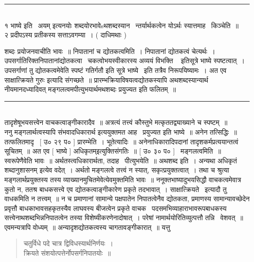 \documentclass[11pt, openany]{book}
\begin{document}
\begin{multicols}{2}
\noindent
\rule{1\linewidth}{0.5pt}\\

१ भाष्ये इति \textendash\ अयम् इत्यनयोः शब्दयोरभावेsथशब्दस्यान \textendash\ न्तर्यार्थकत्वेन योऽर्थः स्यात्तमाह \textendash\ किञ्चेति~॥\\

२ प्रदीपऽस्य प्रतीकस्य सत्ताऽवगम्या~। ( दाधिमथाः ) 

\columnbreak

\noindent
शब्दः प्रयोजनवाचीति भावः~॥ निपातानां च द्योतकत्वमिति~। निपातानां द्योतकत्वं चेत्यर्थः~। उपसर्गातिरिक्तनिपातानांद्योतकत्वा \textendash\ चकत्वोभयस्वीकारस्य {\qt अव्ययं विभक्ति \textendash\ } इतिसूत्रे भाष्ये स्पष्टत्वात्~। उपसर्गाणां तु द्योतकत्वमेवेति स्पष्टं गतिर्गतौ इति सूत्रे भाष्ये \textendash\ इति तत्रैव निरूपयिष्यामः~। अत एव साक्षात्क्रियते गुरुः इत्यादि संगच्छते~॥ प्रारम्भक्रियाविषयत्वद्योतकस्यापि अथशब्दस्यान्यार्थ नीयमानदध्यादिवत् मङ्गलत्वमपीत्युभयार्थमथशब्दः प्रयुज्यत इति फलितम्~॥

\noindent
\rule{1\linewidth}{0.5pt}\\

तादृशेषूभयसत्त्वेन वाचकत्वाङ्गीकारादैव~॥ अत्रत्यं तत्त्वं कौस्तुभे मत्कृततद्व्याख्याने च स्पष्टम्~॥\\

ननु मङ्गलार्थत्वस्यापि संभवादधिकारार्थ इत्ययुक्तमत आह \textendash\ प्रयुज्यत इति भाष्ये~॥ अनेन तत्सिद्धिः~॥ तत्फलितमादृ \textendash\ [ उ० २९ प० ] प्रारम्भेति~। भूतेत्यादिः~॥ अनेनाधिकारादिपदानां तादृशकर्मप्रत्ययान्तत्वं सूचितम्~॥ अत एव [ भाष्ये ] {\qt अधिकृतम्}इत्युक्तिसंगतिः~॥ [ उ० ३० प० ] \textendash\ मङ्गलत्वमिति~॥ स्वरूपेणैवेति भावः~॥ अर्थतस्त्वधिकारार्थता, तदाह \textendash\ पीत्युभयेति~॥ अथशब्द इति~। अन्यथा {\qt अधिकृतं शब्दानुशासनम्} इत्येव वदेत्~। अर्थतो मङ्गलत्वे तत्त्वं न स्यात्, सकृत्प्रयुक्तत्वात्~। तथा च श्रुत्या मङ्गलार्थप्रयुक्तस्य तस्य व्याख्यानमुचितमेवेत्येवमुक्तमिति भावः~॥ ननूक्तभाष्यादुभयसिद्धौ वाचकत्वमेवात्र कुतो न, ततश्र बाधकसत्त्वे एव द्योतकत्वाङ्गीकारेण प्रकृते तदभावात्~। साक्षात्क्रियते \textendash\ इत्यादौ तु वाधकमिति न तत्त्वम्~॥ न च प्रमाणानां सामान्ये पक्षपातेन निपातत्वेनैव द्योतकता, प्रमाणस्य सामान्यावच्छेदेन प्रवृत्तौ बाधकाभावसहकृतस्यैव लाघवस्य बीजत्वेन प्रकृते वाचक \textendash\ पदसमभिव्याहाराभावरूपबाधकस्य सत्त्वेनाथशब्दभिन्ननिपातत्वेन तस्या विशेष्यीकरणेनादोषात्~। परेषां नामार्थयोरितिव्युत्पत्तौ तन्नि \textendash\ वेशवत्~॥ एवमन्यत्रापि वोध्यम्~॥ अन्यादृशद्योतकत्वस्य चागतावङ्गीकारात्~॥ यत्तु \textendash\ 

\begin{quote}
{\qt चतुर्विधे पदे चात्र द्विविधस्यार्थनिर्णयः~।\\
क्रियते संशयोत्पत्तेर्नोपसर्गनिपातयोः~॥

}
\end{quote}
\end{multicols}
\end{document}
